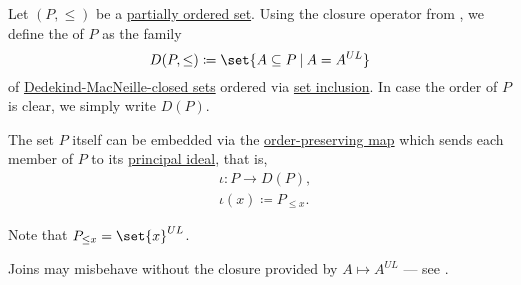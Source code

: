 \begin{definition}\label{def:dedekind_macnielle_completion}
  Let \( (P, \leq) \) be a \hyperref[def:partially_ordered_set]{partially ordered set}. Using the closure operator from , we define the  of \( P \) as the family
  \begin{equation*}
    D(P, \leq) \coloneqq \set{ A \subseteq P \given A = A^{UL} }
  \end{equation*}
  of \hyperref[def:macnielle_closure]{Dedekind-MacNeille-closed sets} ordered via \hyperref[def:subset]{set inclusion}. In case the order of \( P \) is clear, we simply write \( D(P) \).

  The set \( P \) itself can be embedded via the \hyperref[def:order_function/preserving]{order-preserving map} which sends each member of \( P \) to its \hyperref[def:lattice_ideal/principal]{principal ideal}, that is,
  \begin{equation*}
    \begin{aligned}
      &\iota: P \to D(P), \\
      &\iota(x) \coloneqq P_{\leq x}.
    \end{aligned}
  \end{equation*}
\end{definition}
\begin{comments}
  \item Note that \( P_{\leq x} = \set{ x }^{UL} \).
  \item Joins may misbehave without the closure provided by \( A \mapsto A^{UL} \) --- see .
\end{comments}


